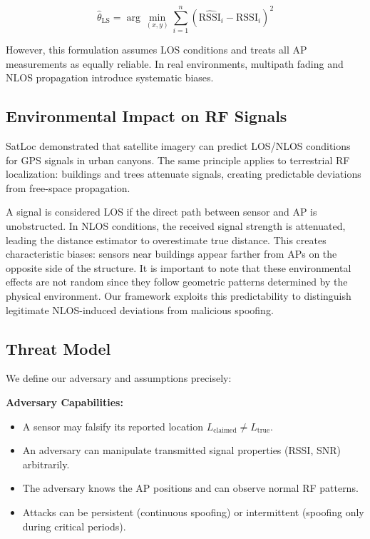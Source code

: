 \documentclass[10pt, twocolumn, letterpaper]{article}
\begin{document}
\begin{equation}
\hat{\theta}_{\text{LS}} = \arg\min_{(x,y)} \sum_{i=1}^n \left( \widehat{\text{RSSI}}_i - \text{RSSI}_i \right)^2
\end{equation}

However, this formulation assumes LOS conditions and treats all AP measurements as equally reliable. In real environments, multipath fading and NLOS propagation introduce systematic biases.

\subsection{Environmental Impact on RF Signals}

SatLoc \cite{sateloc} demonstrated that satellite imagery can predict LOS/NLOS conditions for GPS signals in urban canyons. The same principle applies to terrestrial RF localization: buildings and trees attenuate signals, creating predictable deviations from free-space propagation.

A signal is considered LOS if the direct path between sensor and AP is unobstructed. In NLOS conditions, the received signal strength is attenuated, leading the distance estimator to overestimate true distance. This creates characteristic biases: sensors near buildings appear farther from APs on the opposite side of the structure. It is important to note that these environmental effects are not random since they follow geometric patterns determined by the physical environment. Our framework exploits this predictability to distinguish legitimate NLOS-induced deviations from malicious spoofing.

\subsection{Threat Model}

We define our adversary and assumptions precisely:

\textbf{Adversary Capabilities:}
\begin{itemize}
    \item A sensor may falsify its reported location $L_{\text{claimed}} \neq L_{\text{true}}$.
    \item An adversary can manipulate transmitted signal properties (RSSI, SNR) arbitrarily.
    \item The adversary knows the AP positions and can observe normal RF patterns.
    \item Attacks can be persistent (continuous spoofing) or intermittent (spoofing only during critical periods).
\end{itemize}
\end{document}
